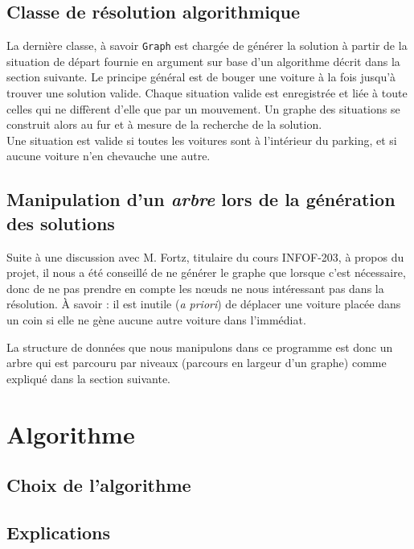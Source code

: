 \documentclass{article}
\begin{document}
    \subsection{Classe de résolution algorithmique}
        La dernière classe, à savoir \texttt{Graph} est chargée de générer la solution à partir de la situation de départ fournie en argument
        sur base d'un algorithme décrit dans la section suivante. Le principe général est de bouger une voiture à la fois jusqu'à trouver une
		solution valide. Chaque situation valide est enregistrée et liée à toute celles qui ne diffèrent d'elle que par un mouvement.
		Un graphe des situations se construit alors au fur et à mesure de la recherche de la solution.\\
		Une situation est valide si toutes les voitures sont à l'intérieur du parking, et si aucune voiture n'en chevauche une autre.

    \subsection{Manipulation d'un \textit{arbre} lors de la génération des solutions}
        Suite à une discussion avec M. Fortz, titulaire du cours INFOF-203, à propos du projet, il nous a été conseillé de ne générer le graphe
        que lorsque c'est nécessaire, donc de ne pas prendre en compte les nœuds ne nous intéressant pas dans la résolution. À savoir : il est
        inutile (\textit{a priori}) de déplacer une voiture placée dans un coin si elle ne gène aucune autre voiture dans l'immédiat.

        La structure de données que nous manipulons dans ce programme est donc un arbre qui est parcouru par niveaux (parcours en largeur d'un graphe)
        comme expliqué dans la section suivante.

\section{Algorithme}
    \subsection{Choix de l'algorithme}
    \subsection{Explications}
\end{document}
